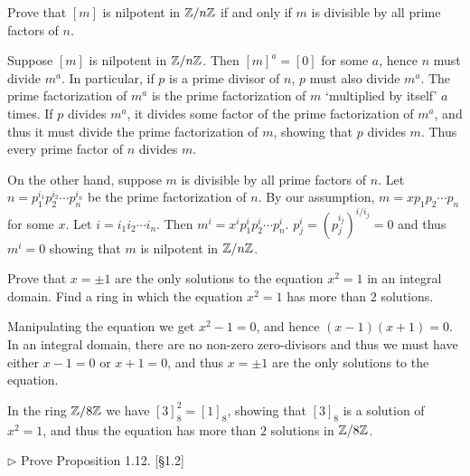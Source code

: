 \begin{problem}
	Prove that $[m]$ is nilpotent in $\mathbb{Z}/n\mathbb{Z}$ if and only if $m$ is divisible by all prime factors of $n$.
\end{problem}

\begin{solution}
	Suppose $[m]$ is nilpotent in $\mathbb{Z}/n\mathbb{Z}$. Then $[m]^a = [0]$ for some $a$, hence $n$ must divide $m^a$. In particular, if $p$ is a prime divisor of $n$, $p$ must also divide $m^a$. The prime factorization of $m^a$ is the prime factorization of $m$ `multiplied by itself' $a$ times. If $p$ divides $m^a$, it divides some factor of the prime factorization of $m^a$, and thus it must divide the prime factorization of $m$, showing that $p$ divides $m$. Thus every prime factor of $n$ divides $m$.
	
	On the other hand, suppose $m$ is divisible by all prime factors of $n$. Let $n = p_1^{i_1} p_2^{i_2} \cdots p_n^{i_n}$ be the prime factorization of $n$. By our assumption, $m = x p_1 p_2 \cdots p_n$ for some $x$. Let $i = i_1 i_2 \cdots i_n$. Then $m^i = x^i p_1^i p_2^i \cdots p_n^i$. $p_j^i = (p_j^{i_j})^{i / i_j} = 0$ and thus $m^i = 0$ showing that $m$ is nilpotent in $\mathbb{Z}/n\mathbb{Z}$.
\end{solution}

\begin{problem}
	Prove that $x = \pm 1$ are the only solutions to the equation $x^2 = 1$ in an integral domain. Find a ring in which the equation $x^2 = 1$ has more than $2$ solutions.
\end{problem}

\begin{solution}
	Manipulating the equation we get $x^2 - 1 = 0$, and hence $(x - 1)(x + 1) = 0$. In an integral domain, there are no non-zero zero-divisors and thus we must have either $x - 1 = 0$ or $x + 1 = 0$, and thus $x = \pm 1$ are the only solutions to the equation.
	
	In the ring $\mathbb{Z}/8\mathbb{Z}$ we have $[3]_8^2 = [1]_8$, showing that $[3]_8$ is a solution of $x^2 = 1$, and thus the equation has more than $2$ solutions in $\mathbb{Z}/8\mathbb{Z}$.
\end{solution}

\begin{problem}
	$\triangleright$ Prove Proposition 1.12. [\S 1.2]
\end{problem}

